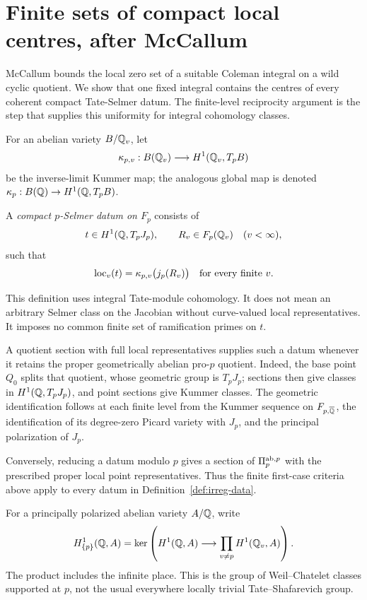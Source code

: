 \section{Finite sets of compact local centres, after McCallum}
\label{sec:irreg-Tate}

McCallum bounds the local zero set of a suitable Coleman integral on
a wild cyclic quotient. We show that one fixed integral contains
the centres of every coherent compact Tate-Selmer datum. The
finite-level reciprocity argument is the step that supplies this
uniformity for integral cohomology classes.

For an abelian variety \(B/\mathbb Q_v\), let
\[
 \kappa_{p,v}:B(\mathbb Q_v)\longrightarrow H^1(\mathbb Q_v,T_pB)
\]
be the inverse-limit Kummer map; the analogous global map is denoted
\(\kappa_p:B(\mathbb Q)\to H^1(\mathbb Q,T_pB)\).

\begin{definition}\label{def:irreg-data}
A \emph{compact \(p\)-Selmer datum on \(F_p\)} consists of
\[
 t\in H^1(\mathbb Q,T_pJ_p),\qquad
 R_v\in F_p(\mathbb Q_v)\quad(v<\infty),
\]
such that
\begin{equation}
 \operatorname{loc}_v(t)=\kappa_{p,v}\bigl(j_p(R_v)\bigr)
 \quad\text{for every finite }v.
 \label{eq:irreg-data}
\end{equation}
\end{definition}

This definition uses integral Tate-module cohomology. It does not
mean an arbitrary Selmer class on the Jacobian without curve-valued
local representatives. It imposes no common finite set of
ramification primes on \(t\).

A quotient section with full local representatives supplies such a
datum whenever it retains the proper geometrically abelian pro-\(p\)
quotient. Indeed, the base point \(Q_0\) splits that quotient, whose
geometric group is \(T_pJ_p\); sections then give classes in
\(H^1(\mathbb Q,T_pJ_p)\), and point sections give Kummer classes.
The geometric identification follows at each finite level from
the Kummer sequence on \(F_{p,\overline{\mathbb Q}}\), the identification of
its degree-zero Picard variety with \(J_p\), and the principal
polarization of \(J_p\).

Conversely, reducing a datum modulo \(p\) gives a section of
\(\Pi_p^{\mathrm{ab},p}\) with the prescribed proper local point
representatives. Thus the finite first-case criteria above apply
to every datum in Definition~\ref{def:irreg-data}.

For a principally polarized abelian variety \(A/\mathbb Q\), write
\begin{equation}
 H^1_{\{p\}}(\mathbb Q,A)
 =
 \ker\left(H^1(\mathbb Q,A)\longrightarrow
                  \prod_{v\neq p}H^1(\mathbb Q_v,A)\right).
 \label{eq:irreg-supported}
\end{equation}
The product includes the infinite place. This is the group of
Weil--Chatelet classes supported at \(p\), not the usual
everywhere locally trivial Tate--Shafarevich group.

